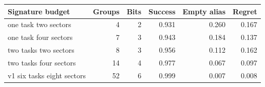 \begin{tabular}{lrrrrr}
\toprule
Signature budget & Groups & Bits & Success & Empty alias & Regret \\
\midrule
one task two sectors & 4 & 2 & 0.931 & 0.260 & 0.167 \\
one task four sectors & 7 & 3 & 0.943 & 0.184 & 0.137 \\
two tasks two sectors & 8 & 3 & 0.956 & 0.112 & 0.162 \\
two tasks four sectors & 14 & 4 & 0.977 & 0.067 & 0.097 \\
v1 six tasks eight sectors & 52 & 6 & 0.999 & 0.007 & 0.008 \\
\bottomrule
\end{tabular}
